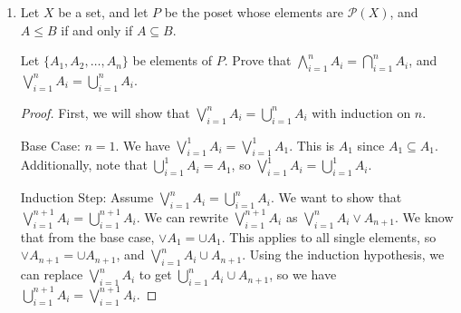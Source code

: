 \documentclass[12pt]{article}
\begin{document}
\begin{enumerate}
\begin{enumerate}
\begin{proof}
Without loss of generality, assume that a poset $P$ has two minimal elements, $a, b$, and one minimum element, $\perp$. By definition of minimum, for all $x \in P$, $\perp \leq x$. Therefore, $\perp \leq a$ and $\perp \leq b$. But by definition of a minimal element, for all $x \in S$ where $S \subseteq P$, $a \leq x$. However, since $\perp \leq x$ for all $x \in P$, it must be that $a = \perp$. The same argument can be applied to $b$, so we have $b = \perp$. Thus, $a = \perp = b$, which means that there can only be one minimal element. 
\end{proof}

\end{enumerate}
(Note: This entire problem could be repeated verbatim for a maximal element as well)

\item Let $X$ be a set, and let $P$ be the poset whose elements are $\mathcal{P}(X)$, and $A\leq B$ if and only if $A\subseteq B$.

Let $\{A_1, A_2, \dots, A_n\}$ be elements of $P$. Prove that $\displaystyle \bigwedge_{i=1}^n A_i = \displaystyle\bigcap_{i=1}^n A_i$, and $\displaystyle \bigvee_{i=1}^n A_i = \displaystyle\bigcup_{i=1}^n A_i$.

\begin{proof}
First, we will show that $\displaystyle \bigvee_{i=1}^n A_i = \displaystyle\bigcup_{i=1}^n A_i$ with induction on $n$. 

Base Case: $n = 1$. We have $\displaystyle \bigvee_{i=1}^1 A_i = \displaystyle \bigvee_{i=1}^1 A_1$. This is $A_1$ since $A_1 \subseteq A_1$. Additionally, note that $ \displaystyle\bigcup_{i=1}^1 A_i = A_1$, so $\displaystyle \bigvee_{i=1}^1 A_i = \displaystyle\bigcup_{i=1}^1 A_i$. 

Induction Step: Assume $\displaystyle \bigvee_{i=1}^{n} A_i = \displaystyle\bigcup_{i=1}^n A_i$. We want to show that $\displaystyle \bigvee_{i=1}^{n+1} A_i = \displaystyle\bigcup_{i=1}^{n+1} A_i$. We can rewrite $\displaystyle \bigvee_{i=1}^{n+1} A_i$ as $\displaystyle \bigvee_{i=1}^{n} A_i  \vee A_{n+1}$. We know that from the base case, $ \vee A_1 =  \cup A_1$. This applies to all single elements, so $ \vee A_{n+1} =  \cup A_{n+1}$, and $\displaystyle \bigvee_{i=1}^{n} A_i  \cup A_{n+1}$. Using the induction hypothesis, we can replace $\displaystyle \bigvee_{i=1}^{n} A_i$ to get $\displaystyle \bigcup_{i=1}^{n} A_i  \cup A_{n+1}$, so we have $\displaystyle \bigcup_{i =1}^{n+1} A_i = \displaystyle \bigvee_{i =1}^{n+1} A_i$. 


\end{proof}
\end{enumerate}
\end{document}
